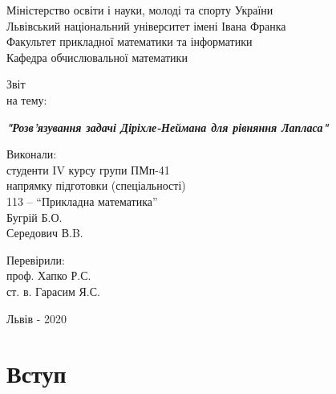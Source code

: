 \documentclass[14pt,a4paper]{extarticle}
\newcounter{e}
\newcounter{tabl}
\numberwithin{equation}{section}
\numberwithin{figure}{section}
\begin{document}
	

 \thispagestyle{empty}

 \begin{center}
	\large
	Міністерство освіти і науки, молоді та спорту України \\
	Львівський національний університет імені Івана Франка \\
	Факультет прикладної математики та інформатики \\
	Кафедра обчислювальної математики
 \end{center}

 \vspace{45pt}

 \vfill

 \begin{center}
	{\Huge{Звіт}}\\
	{\large на тему:}
 \end{center}

 \begin{center}\Large
	\textbf{\emph{"Розв'язування задачі Діріхле-Неймана для рівняння Лапласа"}}
 \end{center}

 \vfill
 \vskip100pt

 \begin{flushleft}
	\hskip8cm 
	Виконали:
	\\ \hskip8cm 
	студенти IV курсу групи ПМп-41
	\\ \hskip8cm
	напрямку підготовки (спеціальності)
	\\ \hskip8cm
	113 -- ``Прикладна математика''
	\\ \hskip8cm
	Бугрій Б.О.
	\\ \hskip8cm
	Середович В.B.
 \end{flushleft}

 \begin{flushleft}
	\hskip8cm 
	Перевірили:
	\\ \hskip8cm
	проф. Хапко Р.С.
	\\ \hskip8cm
	ст. в. Гарасим Я.С.
 \end{flushleft}

 \vfill

 \begin{center}
	\large
	Львів - 2020
 \end{center}

 \newpage
 \thispagestyle{empty}
 \tableofcontents

 \newpage
 \thispagestyle{empty}
 \section*{Вступ}
 \begin{center}\end{center}
 
\end{document}
